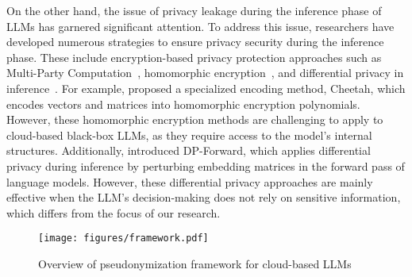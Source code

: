 On the other hand, the issue of privacy leakage during the inference phase of LLMs has garnered significant attention.
To address this issue, researchers have developed numerous strategies to ensure privacy security during the inference phase. 
These include encryption-based privacy protection approaches such as Multi-Party Computation~\citep{goldreich1998secure, dong2022fusion}, homomorphic encryption~\citep{acar2018survey, hao2022iron,lu2023bumblebee}, and differential privacy in inference~\citep{dwork2006differential, dwork2008differential, majmudar2022differentially}.
%
For example, \citet{huang2022cheetah} proposed a specialized encoding method, Cheetah, which encodes vectors and matrices into homomorphic encryption polynomials.
However, these homomorphic encryption methods are challenging to apply to cloud-based black-box LLMs, as they require access to the model's internal structures.
%
Additionally, \citet{du2023dp} introduced DP-Forward, which applies differential privacy during inference by perturbing embedding matrices in the forward pass of language models. 
However, these differential privacy approaches are mainly effective when the LLM’s decision-making does not rely on sensitive information, which differs from the focus of our research.


\begin{figure*}[th]
    \centering
    \vspace{-0.2cm}
    \texttt{[image: figures/framework.pdf]}
    \caption{Overview of pseudonymization framework for cloud-based LLMs}
    \vspace{-0.2cm}
    \label{fig:framework}
\end{figure*}

